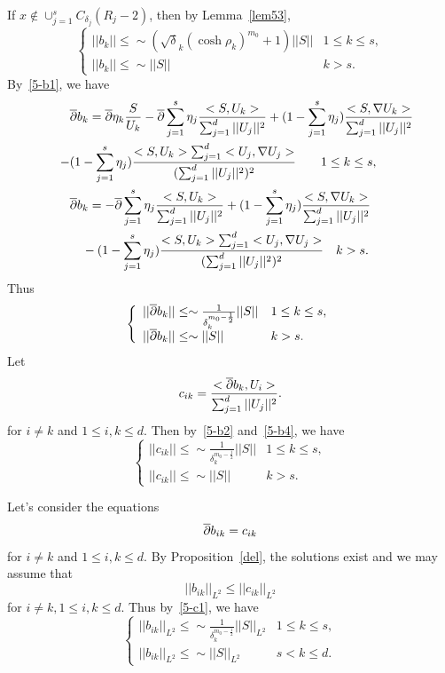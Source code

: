 If $x\notin \cup_{j=1}^sC_{\delta_j}(R_j-2)$, then by Lemma~\ref{lem53},
\begin{equation}\label{5-b2}
\left\{
\begin{array}{ll}
||b_k||\leq\sim
(\sqrt\delta_k (\cosh\rho_k)^{m_0}+1)||S||& 1\leq k\leq s,\\
 ||b_k||\leq\sim ||S||
&  k>s.
\end{array}
\right.
\end{equation}
By~\eqref{5-b1}, we have
\begin{align}\label{5-b3}
\begin{split}
&\overline{\partial} b_k=\overline{\partial}\eta_k\frac{S}{U_k}
-\overline{\partial}\sum_{j=1}^s\eta_j
\frac{<S,U_k>}{\sum_{j=1}^d||U_j||^2}
+(1-\sum_{j=1}^s\eta_j)\frac{<S,\nabla U_k>}
{\sum_{j=1}^d||U_j||^2}\\\quad-
&(1-\sum_{j=1}^s\eta_j)\frac{<S,U_k>\sum_{j=1}^d<U_j,\nabla U_j>}
{(\sum_{j=1}^d||U_j||^2)^2}\qquad 1\leq k\leq s,\\
&\overline{\partial} b_k=
-\overline{\partial}\sum_{j=1}^s\eta_j
\frac{<S,U_k>}{\sum_{j=1}^d||U_j||^2}
+(1-\sum_{j=1}^s\eta_j)\frac{<S,\nabla U_k>}
{\sum_{j=1}^d||U_j||^2}\\
&\quad-
(1-\sum_{j=1}^s\eta_j)\frac{<S,U_k>\sum_{j=1}^d<U_j,\nabla U_j>}
{(\sum_{j=1}^d||U_j||^2)^2}\quad  k>s.
\end{split}
\end{align}
Thus
\begin{equation}\label{5-b4}
\left\{
\begin{array}{ll}
||\overline{\partial} b_k||\leq \sim
\frac{1}{\delta_k^{m_0-\frac 12}}
||S||& 1\leq k\leq s,\\
||\overline{\partial} b_k||\leq\sim||S|| &  k>s.
\end{array}
\right.
\end{equation}
Let
\begin{equation}
c_{ik}=\frac{<\overline{\partial} b_k, U_i>}{\sum_{j=1}^d||U_j||^2}.
\end{equation}
for $i\neq k$ and
$1\leq i,k\leq d$. Then 
by~\eqref{5-b2} and~\eqref{5-b4}, we have
\begin{equation}\label{5-c1}
\left\{
\begin{array}{ll}
 ||c_{ik}||\leq\sim \frac{1}{\delta_k^{m_0-\frac 12}}
||S|| & 1\leq k\leq s,\\
 ||c_{ik}||\leq \sim 
||S|| &  k>s.
\end{array}
\right.
\end{equation}

Let's consider the equations
\[
\overline{\partial} b_{ik}=c_{ik}
\]
for $i\neq k$ and $1\leq i,k\leq d$. By Proposition~\ref{del}, the
solutions exist and we may assume that
\[
||b_{ik}||_{L^2}\leq ||c_{ik}||_{L^2}
\]
for $i\neq k, 1\leq i,k\leq d$. Thus
by~\eqref{5-c1}, we have
\begin{equation}\label{5-b5}
\left\{
\begin{array}{ll}
||b_{ik}||_{L^2}\leq\sim \frac{1}{\delta_k^{m_0-\frac 12}}
||S||_{L^2} & 1\leq k\leq s,\\
||b_{ik}||_{L^2}\leq \sim ||S||_{L^2}& 
 s<k\leq d.
\end{array}
\right.
\end{equation}

